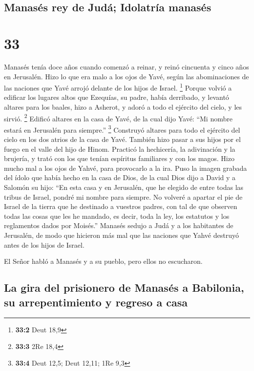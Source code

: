 \hypertarget{manasuxe9s-rey-de-juduxe1-idolatruxeda-manasuxe9s}{%
\subsection{Manasés rey de Judá; Idolatría
manasés}\label{manasuxe9s-rey-de-juduxe1-idolatruxeda-manasuxe9s}}

\hypertarget{section-32}{%
\section{33}\label{section-32}}

 Manasés tenía doce años cuando comenzó a reinar, y reinó
cincuenta y cinco años en Jerusalén.  Hizo lo que era malo
a los ojos de Yavé, según las abominaciones de las naciones que Yavé
arrojó delante de los hijos de Israel. \footnote{\textbf{33:2} Deut 18,9}
 Porque volvió a edificar los lugares altos que Ezequías,
su padre, había derribado, y levantó altares para los baales, hizo a
Asherot, y adoró a todo el ejército del cielo, y les sirvió. \footnote{\textbf{33:3}
  2Re 18,4}  Edificó altares en la casa de Yavé, de la
cual dijo Yavé: ``Mi nombre estará en Jerusalén para siempre.''
\footnote{\textbf{33:4} Deut 12,5; Deut 12,11; 1Re 9,3} 
Construyó altares para todo el ejército del cielo en los dos atrios de
la casa de Yavé.  También hizo pasar a sus hijos por el
fuego en el valle del hijo de Hinom. Practicó la hechicería, la
adivinación y la brujería, y trató con los que tenían espíritus
familiares y con los magos. Hizo mucho mal a los ojos de Yahvé, para
provocarlo a la ira.  Puso la imagen grabada del ídolo que
había hecho en la casa de Dios, de la cual Dios dijo a David y a Salomón
su hijo: ``En esta casa y en Jerusalén, que he elegido de entre todas
las tribus de Israel, pondré mi nombre para siempre.  No
volveré a apartar el pie de Israel de la tierra que he destinado a
vuestros padres, con tal de que observen todas las cosas que les he
mandado, es decir, toda la ley, los estatutos y los reglamentos dados
por Moisés.''  Manasés sedujo a Judá y a los habitantes de
Jerusalén, de modo que hicieron más mal que las naciones que Yahvé
destruyó antes de los hijos de Israel.

 El Señor habló a Manasés y a su pueblo, pero ellos no
escucharon.

\hypertarget{la-gira-del-prisionero-de-manasuxe9s-a-babilonia-su-arrepentimiento-y-regreso-a-casa}{%
\subsection{La gira del prisionero de Manasés a Babilonia, su
arrepentimiento y regreso a
casa}\label{la-gira-del-prisionero-de-manasuxe9s-a-babilonia-su-arrepentimiento-y-regreso-a-casa}}

